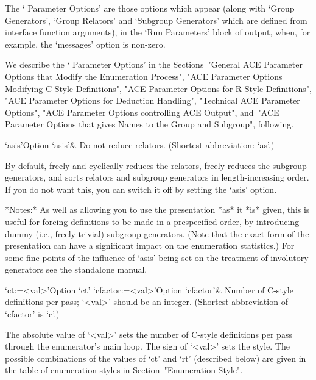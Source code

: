 The \lq{}{\ACE} Parameter Options'  are  those  options  which  appear
(along  with  `Group  Generators',  `Group  Relators'  and   `Subgroup
Generators'  which  are  defined  from   {\ACE}   interface   function
arguments), in the \lq{}Run Parameters' block of {\ACE} output,  when,
for example, the `messages' option is non-zero.

We   describe   the   \lq{}{\ACE}   Parameter    Options'    in    the
Sections~"General ACE Parameter Options that  Modify  the  Enumeration
Process", "ACE Parameter Options Modifying C-Style Definitions",  "ACE
Parameter Options for R-Style Definitions", "ACE Parameter Options for
Deduction Handling", "Technical ACE Parameter Options", "ACE Parameter
Options controlling ACE Output", and~"ACE Parameter Options that gives
Names to the Group and Subgroup", following.


\beginitems

\>`asis'{Option `asis'}&
Do not reduce relators. (Shortest abbreviation: `as'.)

By default, {\ACE} freely  and cyclically reduces the relators, freely
reduces  the  subgroup generators,  and  sorts  relators and  subgroup
generators in length-increasing  order.  If you do not  want this, you
can switch it off by setting the `asis' option.

*Notes:* As well as allowing you  to use the presentation *as* it *is*
given,  this  is  useful for  forcing  definitions  to  be made  in  a
prespecified  order,  by  introducing  dummy  (i.e.,  freely  trivial)
subgroup generators.   (Note that the  exact form of  the presentation
can  have a significant  impact on  the enumeration  statistics.)  For
some fine points of the influence of `asis' being set on the treatment
of involutory generators see the {\ACE} standalone manual.

\>`ct:=<val>'{Option `ct'}
\>`cfactor:=<val>'{Option `cfactor'}&
Number of C-style definitions per pass; `<val>' should be an  integer. 
(Shortest abbreviation of `cfactor' is `c'.)

The absolute value of `<val>' sets the
number of C-style definitions per  pass through  the enumerator's main
loop. The sign of `<val>'  sets the  style. The possible  combinations
of the values of `ct' and  `rt'  (described below)  are  given in  the
table of  enumeration styles in Section~"Enumeration Style".

